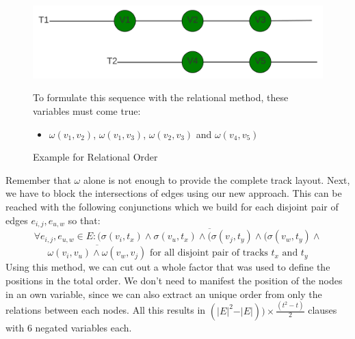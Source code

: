 \documentclass[bachelor, english]{algothesis}
\begin{document}
\begin{figure}[ht]
  \centering
  \begin{minipage}{0.6\textwidth}
    \includegraphics[width=\linewidth]{figures/Order_example.png}
  \caption{Example for Relational Order}
  \label{fig:order_example_rel}
  \end{minipage}%
  \begin{minipage}{0.4\textwidth}
    To formulate this sequence with the relational method, these variables must come true:
    \begin{itemize}
    \item  $\omega(v_1,v_2)$, $\omega(v_1,v_3)$, $\omega(v_2,v_3)$ and $\omega(v_4,v_5)$
    \end{itemize}
  \end{minipage}
\end{figure}

Remember that $\omega$ alone is not enough to provide the complete track layout. Next, we have to block the intersections of edges using our new approach. This can be reached with the following conjunctions which we build for each disjoint pair of edges $e_{i,j}, e_{u,w}$ so that:
    $$ \forall e_{i,j}, e_{u,w} \in E : \overline{(\sigma(v_i,t_x) \land \sigma(v_u,t_x) \land (\sigma(v_j,t_y) \land (\sigma(v_w,t_y) \land}$$
    $$ \overline{\omega(v_i,v_u) \land \omega(v_w,v_j)}\text{ for all disjoint pair of tracks } t_x \text{ and } t_y $$
Using this method, we can cut out a whole factor that was used to define the positions in the total order. We don't need to manifest the position of the nodes in an own variable, since we can also extract an unique order from only the relations between each nodes. All this results in
$ (\vert E \vert^2 - \vert E \vert)) \times \frac{(t^2-t)}{2}$ clauses with 6 negated variables each.
\end{document}
